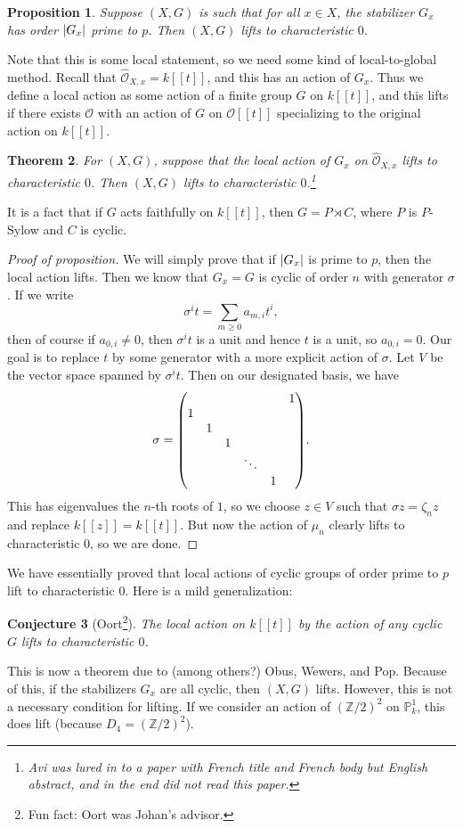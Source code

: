 \documentclass[leqno, openany]{memoir}
\newtheorem{thm}{Theorem}[section]
\newtheorem{prop}[thm]{Proposition}
\newtheorem{conj}[thm]{Conjecture}
\theoremstyle{definition}
\theoremstyle{remark}
\theoremstyle{plain}
\theoremstyle{definition}
\theoremstyle{remark}
\newcommand{\Z}{\mathbb{Z}}
\renewcommand{\P}{\mathbb{P}}
\newcommand{\mc}[1]{\mathcal{#1}}
\newcommand{\wh}[1]{\widehat{#1}}
\begin{document}
\begin{prop}
    Suppose $(X,G)$ is such that for all $x \in X$, the stabilizer $G_x$ has order $\abs{G_x}$ prime to $p$. Then $(X, G)$ lifts to characteristic $0$.
\end{prop}

Note that this is some local statement, so we need some kind of local-to-global method. Recall that $\wh{\mc{O}}_{X,x} = k[[t]]$, and this has an action of $G_x$. Thus we define a local action as some action of a finite group $G$ on $k[[t]]$, and this lifts if there exists $\mc{O}$ with an action of $G$ on $\mc{O}[[t]]$ specializing to the original action on $k[[t]]$.

\begin{thm}
    For $(X, G)$, suppose that the local action of $G_x$ on $\wh{\mc{O}}_{X,x}$ lifts to characteristic $0$. Then $(X, G)$ lifts to characteristic $0$.\footnote{Avi was lured in to a paper with French title and French body but English abstract, and in the end did not read this paper.}
\end{thm}

It is a fact that if $G$ acts faithfully on $k[[t]]$, then $G = P \rtimes C$, where $P$ is $P$-Sylow and $C$ is cyclic.

\begin{proof}[Proof of proposition]
    We will simply prove that if $\abs{G_x}$ is prime to $p$, then the local action lifts. Then we know that $G_x = G$ is cyclic of order $n$ with generator $\sigma$. If we write
    \[ \sigma^i t = \sum_{m \geq 0} a_{m,i} t^i, \]
    then of course if $a_{0,i} \neq 0$, then $\sigma^i t$ is a unit and hence $t$ is a unit, so $a_{0,i} = 0$. Our goal is to replace $t$ by some generator with a more explicit action of $\sigma$. Let $V$ be the vector space spanned by $\sigma^i t$. Then on our designated basis, we have
    \[ \sigma = \mqty( & & & & & 1 \\ 1 & & & & & \\ & 1 & & & & \\ & & 1 & & & \\ & & & \ddots & & \\ & & & & 1 &). \]
    This has eigenvalues the $n$-th roots of $1$, so we choose $z \in V$ such that $\sigma z = \zeta_n z$ and replace $k[[z]] = k[[t]]$. But now the action of $\mu_n$ clearly lifts to characteristic $0$, so we are done.
\end{proof}

We have essentially proved that local actions of cyclic groups of order prime to $p$ lift to characteristic $0$. Here is a mild generalization:

\begin{conj}[Oort\footnote{Fun fact: Oort was Johan's advisor.}]
    The local action on $k[[t]]$ by the action of any cyclic $G$ lifts to characteristic $0$.
\end{conj}

This is now a theorem due to (among others?) Obus, Wewers, and Pop. Because of this, if the stabilizers $G_x$ are all cyclic, then $(X, G)$ lifts. However, this is not a necessary condition for lifting. If we consider an action of $(\Z/2)^2$ on $\P^1_k$, this does lift (because $D_4 = (\Z/2)^2$).
\end{document}
